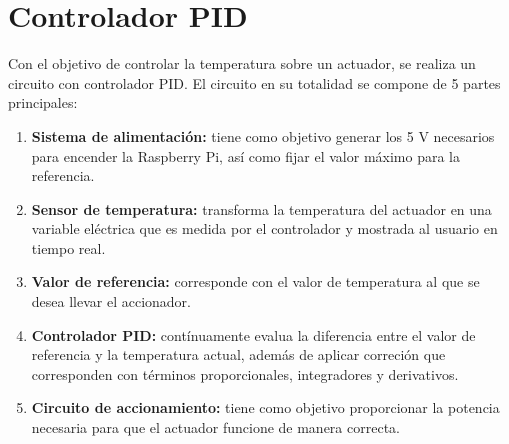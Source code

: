 \documentclass{wileysix}
\begin{document}
	
\subtitle{Electr\'onica para Ciencias}

\halftitlepage
\titlepage



\tableofcontents
\chapter{Controlador PID}

Con el objetivo de controlar la temperatura sobre un actuador, se realiza un circuito con controlador PID. El circuito en su totalidad se compone de 5 partes principales:
\begin{enumerate}
	\item \textbf{Sistema de alimentaci\'on:} tiene como objetivo generar los 5 V necesarios para encender la Raspberry Pi, as\'i como fijar el valor m\'aximo para la referencia.
	\item \textbf{Sensor de temperatura:} transforma la temperatura del actuador en una variable el\'ectrica que es medida por el controlador y mostrada al usuario en tiempo real. 
	\item \textbf{Valor de referencia:} corresponde con el valor de temperatura al que se desea llevar el accionador.
	\item \textbf{Controlador PID:} cont\'inuamente evalua la diferencia entre el valor de referencia y la temperatura actual, adem\'as de aplicar correci\'on que corresponden con t\'erminos proporcionales, integradores y derivativos.
	\item \textbf{Circuito de accionamiento:} tiene como objetivo proporcionar la potencia necesaria para que el actuador funcione de manera correcta.
\end{enumerate}
\end{document}
